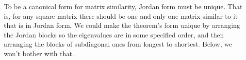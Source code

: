 


\begin{remark}
To be a canonical form for 
matrix similarity,
Jordan form must be unique.
That is, for any square matrix there should be one and only one 
matrix similar to it that is in Jordan form.
We could make the theorem's form unique 
by arranging the Jordan blocks so the eigenvalues are in 
some specified order, and then arranging
the blocks of subdiagonal ones from 
longest to shortest.
Below, we won't bother with that.
\end{remark}

